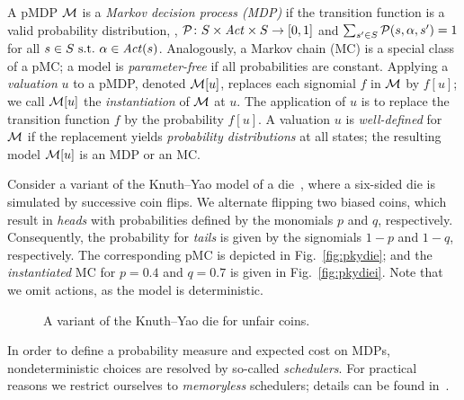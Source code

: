 A pMDP $\mathcal{M}$ is a \emph{Markov decision process (MDP)} if the transition function is a valid probability distribution, \ie, $\mathcal{P} \colon S \times \mathit{Act} \times S \rightarrow [0,1]$ and $\sum_{s'\in S}\mathcal{P}(s,\alpha,s') = 1$ for all $s \in S \mbox{ s.t.\ } \alpha \in \mathit{Act}(s)$. 
Analogously, a Markov chain (MC) is a special class of a pMC; a model is \emph{parameter-free} if all  probabilities are constant. Applying a \emph{valuation} $u$ to a pMDP, denoted $\mathcal{M}[u]$, replaces each signomial $f$ in $\mathcal{M}$ by $f[u]$; we call $\mathcal{M}[u]$ the \emph{instantiation} of $\mathcal{M}$ at $u$.
The application of $u$ is to replace the transition function $f$ by the probability $f[u]$. 
A valuation $u$ is \emph{well-defined} for $\mathcal{M}$ if the replacement yields \emph{probability distributions} at all states; the resulting model $\mathcal{M}[u]$ is an MDP or an MC.

\begin{example}[pMC]\label{ex:die}
Consider a variant of the Knuth--Yao model of a die~\cite{KY76}, where a six-sided die is simulated by successive coin flips. 
We alternate flipping two biased coins, which result in \emph{heads} with probabilities defined by the monomials $p$ and $q$, respectively. Consequently, the probability for \emph{tails} is given by the signomials $1-p$ and $1-q$, respectively. The corresponding pMC is depicted in Fig.~\ref{fig:pkydie}; and the \emph{instantiated} MC for $p = 0.4$ and $q = 0.7$ is given in Fig.~\ref{fig:pkydiei}. Note that we omit actions, as the model is deterministic.
\end{example}
%
\begin{figure}[t]
\centering
	\subfigure[Instantiation using $p{=}0.4$ and $q{=}0.7$]{
		\scalebox{0.75}{
			
	\label{fig:pkydiei}
		}
	}
\caption{A variant of the Knuth--Yao die for unfair coins.}
\vspace{-0.5cm}
\end{figure}
%
%
In order to define a probability measure and expected cost on MDPs, nondeterministic choices are resolved by so-called \emph{schedulers}.
For practical reasons we restrict ourselves to \emph{memoryless} schedulers; details can be found in~\cite{BK08}.
%

